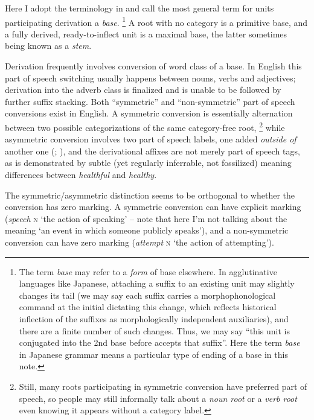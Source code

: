 \documentclass[UTF8, a4paper, oneside, scheme=plain, 12pt]{ctexbook}
\newcommand*{\citepage}[1]{p.~{#1}}
\newcommand*{\term}[1]{\emph{#1}}
\newcommand{\form}[1]{\emph{#1}}
\newcommand{\formcat}[1]{\textsc{#1}}
\newcommand{\translate}[1]{`#1'}
\begin{document}
Here I adopt the terminology in \citet{cgel}
and call the most general term for units participating derivation a \term{base}.%
\footnote{
    The term \term{base} may refer to a \emph{form} of base elsewhere.
    In agglutinative languages like Japanese,
    attaching a suffix to an existing unit may slightly changes its tail
    (we may say each suffix carries a morphophonological command at the initial
    dictating this change,
    which reflects historical inflection of the suffixes as 
    morphologically independent auxiliaries),
    and there are a finite number of such changes.
    Thus, we may say ``this unit is conjugated into the 2nd base before accepts that suffix''.
    Here the term \term{base} in Japanese grammar
    means a particular type of ending 
    of a base in this note.
}
A root with no category is a primitive base,
and a fully derived, ready-to-inflect unit is a maximal base,
the latter sometimes being known as a \term{stem}.


Derivation frequently involves conversion of word class of a base.
In English this part of speech switching usually happens between 
nouns, verbs and adjectives;
derivation into the adverb class is finalized 
and is unable to be followed by further suffix stacking.
Both ``symmetric'' and ``non-symmetric'' part of speech conversions exist in English.
A symmetric conversion is essentially 
alternation between two possible categorizations of the same category-free root,%
\footnote{
    Still, many roots participating in symmetric conversion 
    have preferred part of speech,
    so people may still informally talk about a \term{noun root} or a \term{verb root}
    even knowing it appears without a category label.
}
while asymmetric conversion involves two part of speech labels,
one added \emph{outside of} another one 
(\citealt[\citepage{1641}]{cgel}; \citealt[\citepage{62}, (15)]{siddiqi2009syntax}),
and the derivational affixes are not merely part of speech tags,
as is demonstrated by 
subtle (yet regularly inferrable, not fossilized) meaning differences between 
\form{healthful} and \form{healthy}.

The symmetric/asymmetric distinction seems to be orthogonal to 
whether the conversion has zero marking.
A symmetric conversion can have explicit marking
(\form{speech} \formcat{n} \translate{the action of speaking} -- 
note that here I'm not talking about the meaning \translate{an event in which someone publicly speaks}), 
and a non-symmetric conversion can have zero marking
(\form{attempt} \formcat{n} \translate{the action of attempting}).
\end{document}
